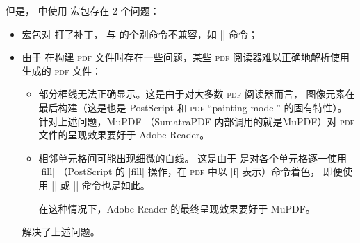 \documentclass[dvipsnames]{article}%
\begin{document}
\medskip
但是，  中使用  宏包存在 2 个问题：
\begin{itemize}
\item {} 宏包对  打了补丁，
与  的个别命令不兼容，如 |\hdotsfor| 命令；

\item 由于  在构建 \textsc{pdf} 文件时存在一些问题，某些 \textsc{pdf} 阅读器难以正确地解析使用  生成的 \textsc{pdf} 文件：
\begin{itemize}
\item 部分框线无法正确显示。这是由于对大多数 \textsc{pdf} 阅读器而言，
图像元素在最后构建（这是也是 PostScript 和 \textsc{pdf} ``painting model'' 的固有特性）。
针对上述问题，MuPDF （SumatraPDF 内部调用的就是MuPDF）对 \textsc{pdf} 文件的呈现效果要好于 Adobe Reader。
\item 相邻单元格间可能出现细微的白线。
这是由于  是对各个单元格逐一使用 |fill| （PostScript 的 |fill| 操作，在 \textsc{pdf} 中以 |f| 表示）命令着色，
即便使用 |\columncolor| 或
|\rowcolor| 命令也是如此。

在这种情况下，Adobe Reader 的最终呈现效果要好于 MuPDF。
\end{itemize}

  解决了上述问题。
\end{itemize}
\end{document}
